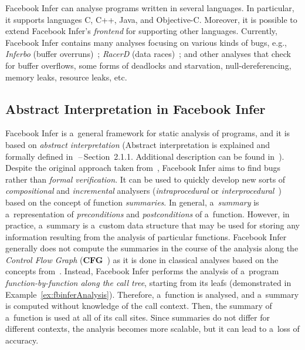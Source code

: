 Facebook Infer can analyse programs written in several languages. In
particular, it supports languages C, C++, Java, and Objective-C. Moreover, it
is possible to extend Facebook Infer's \emph{frontend} for supporting other
languages. Currently, Facebook Infer contains many analyses focusing on various
kinds of bugs, e.g., \emph{Inferbo} (buffer overruns)~\cite{inferboOnline};
\emph{RacerD} (data races)~\cite{racerD, racerDOnline,
staticRaceDetectorTruePositive}; and other analyses that check for buffer
overflows, some forms of deadlocks and starvation, null-dereferencing, memory
leaks, resource leaks, etc.

\subsection{Abstract Interpretation in Facebook Infer}

Facebook Infer is a~general framework for static analysis of programs, and it
is based on \emph{abstract interpretation} (Abstract interpretation is
explained and formally defined in~\cite{harmimBP}\,--\,Section~2.1.1.
Additional description can be found in~\cite{AIBasedFormalMethodsCousot,
AILatticeModelCousot, AIInNutshellCousot, AICousotWeb, favAI,
projectPracticeMarcin2018, wideningNarrowingCousot, programAnalysisNielson,
staticAnalysisMoller, favLatticesAndFixpoints}). Despite the original approach
taken from~\cite{inferBiabduction}, Facebook Infer aims to find bugs rather
than \emph{formal verification}. It can be used to quickly develop new sorts of
\emph{compositional} and \emph{incremental} analysers (\emph{intraprocedural}
or \emph{interprocedural}~\cite{programAnalysisNielson}) based on the concept
of function \emph{summaries}. In general, a~\emph{summary} is a~representation
of \emph{preconditions} and \emph{postconditions} of a~function. However, in
practice, a~summary is a~custom data structure that may be used for storing
any information resulting from the analysis of particular functions. Facebook
Infer generally does not compute the summaries in the course of the analysis
along the \emph{Control Flow Graph}
(\textbf{CFG}~\cite{controlFlowAnalysisAllen}) as it is done in classical
analyses based on the concepts from~\cite{dataflowAnalysisGraphReachability,
dataflowAnalysisApproaches}. Instead, Facebook Infer performs the analysis of
a~program \emph{function-by-function along the call tree}, starting from its
leafs (demonstrated in Example~\ref{ex:fbinferAnalysis}). Therefore, a~function
is analysed, and a~summary is computed without knowledge of the call context.
Then, the summary of a~function is used at all of its call sites. Since
summaries do not differ for different contexts, the analysis becomes more
scalable, but it can lead to a~loss of accuracy.

